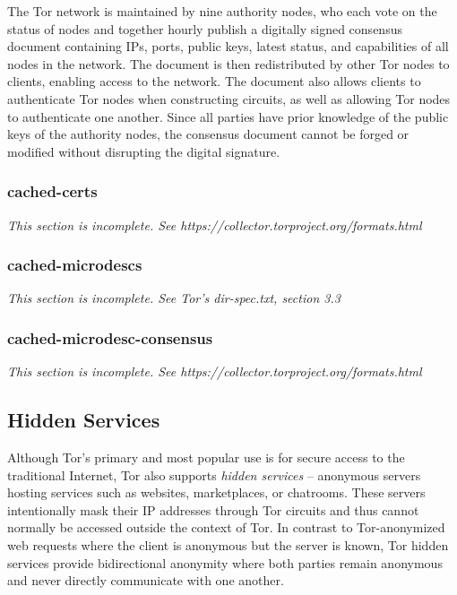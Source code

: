 The Tor network is maintained by nine authority nodes, who each vote on the status of nodes and together hourly publish a digitally signed consensus document containing IPs, ports, public keys, latest status, and capabilities of all nodes in the network. The document is then redistributed by other Tor nodes to clients, enabling access to the network. The document also allows clients to authenticate Tor nodes when constructing circuits, as well as allowing Tor nodes to authenticate one another. Since all parties have prior knowledge of the public keys of the authority nodes, the consensus document cannot be forged or modified without disrupting the digital signature.\cite{xin2009design}

\subsubsection{cached-certs}

\emph{This section is incomplete. See https://collector.torproject.org/formats.html}

\subsubsection{cached-microdescs}

\emph{This section is incomplete. See Tor's dir-spec.txt, section 3.3}

\subsubsection{cached-microdesc-consensus}

\emph{This section is incomplete. See https://collector.torproject.org/formats.html}

\subsection{Hidden Services}
\label{sec:HiddenServices}

Although Tor's primary and most popular use is for secure access to the traditional Internet, Tor also supports \emph{hidden services} -- anonymous servers hosting services such as websites, marketplaces, or chatrooms. These servers intentionally mask their IP addresses through Tor circuits and thus cannot normally be accessed outside the context of Tor. In contrast to Tor-anonymized web requests where the client is anonymous but the server is known, Tor hidden services provide bidirectional anonymity where both parties remain anonymous and never directly communicate with one another.\cite{nicolussi2011human}

